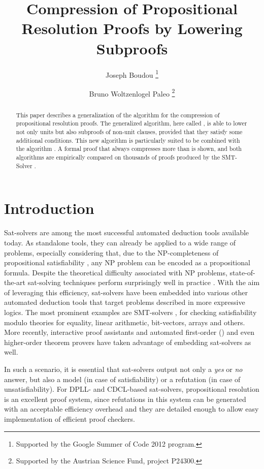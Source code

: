 \documentclass{llncs}
\title{Compression of Propositional Resolution Proofs by Lowering Subproofs}
\author{
  Joseph Boudou\inst{1}
  \thanks{Supported by the Google Summer of Code 2012 program.}
  \and 
  Bruno Woltzenlogel Paleo\inst{2}
  \thanks{Supported by the Austrian Science Fund, project P24300.}
}
\institute{
  Universit\'e Paul Sabatier, Toulouse \\
  \email{joseph.boudou@matabio.net}
  \and 
  Vienna University of Technology \\
  \email{bruno@logic.at}
}
\begin{document}
\maketitle


\begin{abstract}
This paper describes a generalization of the {\LowerUnits} algorithm \cite{LURPI} for the
compression of propositional resolution proofs.  The generalized algorithm, here called
{\LowerUnivalents}, is able to lower not only units but also subproofs of non-unit clauses, provided
that they satisfy some additional conditions.  This new algorithm is particularly suited to be
combined with the {\RecyclePivotsIntersection} algorithm \cite{LURPI}.  A formal proof that
{\LowerUnivalents} always compresses more than {\LowerUnits} is shown, and both algorithms are
empirically compared on thousands of proofs produced by the SMT-Solver \veriT.
\end{abstract}

\setcounter{footnote}{0}

\section{Introduction}

Sat-solvers are among the most successful automated deduction tools available today. As standalone
tools, they can already be applied to a wide range of problems, especially considering that, due to
the NP-completeness of propositional satisfiability \cite{cook}, any NP problem can be encoded as a
propositional formula. Despite the theoretical difficulty associated with NP
problems, state-of-the-art sat-solving techniques perform surprisingly well in practice
\cite{sat-competition}. With the aim of leveraging this efficiency, sat-solvers have been embedded
into various other automated deduction tools that target problems described in more expressive
logics. The most prominent examples are SMT-solvers \cite{veriT}, for checking satisfiability modulo
theories for equality, linear arithmetic, bit-vectors, arrays and others. More recently,
interactive proof assistants \cite{isabelle-blanchette-boehme} and automated first-order
(\cite{iProver}) and even higher-order \cite{satallax} theorem provers have
taken advantage of embedding sat-solvers as well.

In such a scenario, it is essential that sat-solvers output not only a \emph{yes} or \emph{no}
answer, but also a model (in case of satisfiability) or a refutation (in case of unsatisfiability).
For DPLL- and CDCL-based sat-solvers, propositional resolution is an excellent proof system, since
refutations in this system can be generated with an acceptable efficiency overhead and they are
detailed enough to allow easy implementation of efficient proof checkers.
\end{document}
